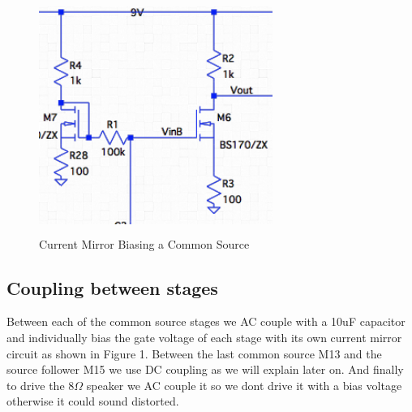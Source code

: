 \documentclass[11pt, twoside, letterpaper]{article}
\begin{document}
\begin{figure}[htbp]
\begin{center}
\includegraphics[width=3in,height=3in]{CurrentMirror.png}
\caption{Current Mirror Biasing a Common Source}
\end{center}
\end{figure}
\FloatBarrier

\subsection{Coupling between stages}

Between each of the common source stages we AC couple with a 10uF capacitor and individually bias the gate voltage of each stage with its own current 
mirror circuit as shown in Figure 1. Between the last common source M13 and the source follower M15 we use DC coupling as we will explain later on. 
And finally to drive the $8\Omega$ speaker we AC couple it so we dont drive it with a bias voltage otherwise it could sound distorted.
\end{document}
